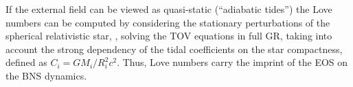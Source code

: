 %
%
If the external field can be viewed as quasi-static (``adiabatic tides'') the 
Love numbers can be computed by considering the stationary perturbations of the spherical 
relativistic star, \ie, solving the \ac{TOV} equations in full \ac{GR}, 
taking into account the strong dependency of the tidal coefficients on the star compactness, defined as 
$C_{i} = GM_i/R_i^2c^2$. 
%
Thus, Love numbers carry the imprint of the \ac{EOS} on the \ac{BNS} dynamics.
%
%


